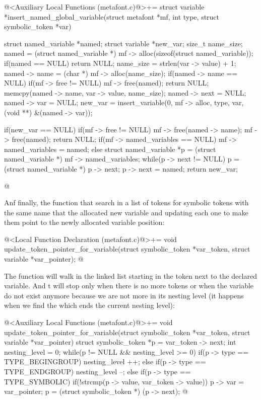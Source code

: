 \iniciocodigo
@<Auxiliary Local Functions (metafont.c)@>+=
struct variable *insert_named_global_variable(struct metafont *mf,
                                             int type,
                                             struct symbolic_token *var){
  struct named_variable *named;
  struct variable *new_var;
  size_t name_size;
  named = (struct named_variable *)
              mf -> alloc(sizeof(struct named_variable));
  if(named == NULL)
    return NULL;
  name_size = strlen(var -> value) + 1;
  named -> name = (char *) mf -> alloc(name_size);
  if(named -> name == NULL){
    if(mf -> free != NULL)
      mf -> free(named);
    return NULL;
  }
  memcpy(named -> name, var -> value, name_size);
  named -> next = NULL;
  named -> var = NULL;
  new_var = insert_variable(0, mf -> alloc, type, var,
                           (void **) &(named -> var));

  if(new_var == NULL){
    if(mf -> free != NULL){
      mf -> free(named -> name);
      mf -> free(named);
      return NULL;
    }
  }
  if(mf -> named_variables == NULL)
    mf -> named_variables = named;
  else{
    struct named_variable *p = (struct named_variable *)
                                   mf -> named_variables;
    while(p -> next != NULL)
      p = (struct named_variable *) p -> next;
    p -> next = named;
  }
  return new_var;
}
@
\fimcodigo

Anf finally, the function that search in a list of tokens for symbolic
tokens with the same name that the allocated new variable and updating
each one to make them point to the newly allocated variable position:

\iniciocodigo
@<Local Function Declaration (metafont.c)@>+=
void update_token_pointer_for_variable(struct symbolic_token *var_token,
                                      struct variable *var_pointer);
@
\fimcodigo

The function will walk in the linked list starting in the token next
to the declared variable. And t will stop only when there is no more
tokens or when the variable do not exist anymore because we are not
more in its nesting level (it happens when we find
the  which ends the current nesting level):

\iniciocodigo
@<Auxiliary Local Functions (metafont.c)@>+=
void update_token_pointer_for_variable(struct symbolic_token *var_token,
                                      struct variable *var_pointer){
  struct symbolic_token *p = var_token -> next;
  int nesting_level = 0;
  while(p != NULL && nesting_level >= 0){
    if(p -> type == TYPE_BEGINGROUP)
      nesting_level ++;
    else if(p -> type == TYPE_ENDGROUP)
      nesting_level --;
    else if(p -> type == TYPE_SYMBOLIC){
      if(!strcmp(p -> value, var_token -> value)){
        p -> var = var_pointer;
      }
    }
    p = (struct symbolic_token *) (p -> next);
  }
}
@
\fimcodigo

